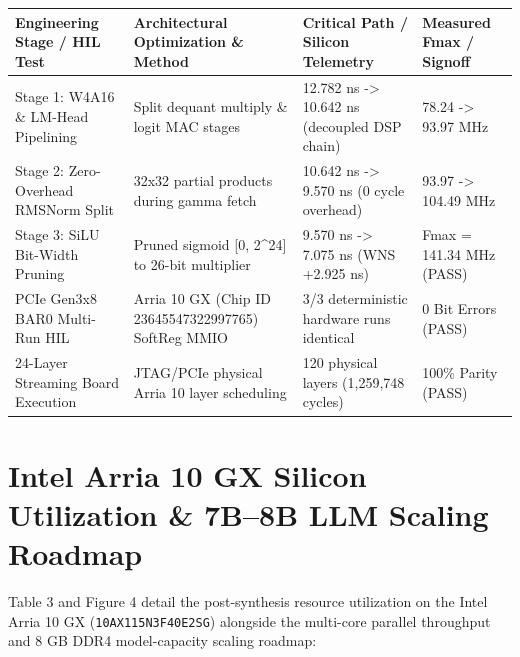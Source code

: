 \documentclass[11pt,a4paper]{article}
\begin{document}
{\footnotesize\renewcommand{\arraystretch}{1.14}\begin{longtable}{@{}L{0.23\textwidth}L{0.27\textwidth}L{0.24\textwidth}L{0.16\textwidth}@{}}\toprule

\textbf{Engineering Stage /\allowbreak{} HIL Test} & \textbf{Architectural Optimization \& Method} & \textbf{Critical Path /\allowbreak{} Silicon Telemetry} & \textbf{Measured Fmax /\allowbreak{} Signoff}\\\midrule\endhead

Stage 1: W4A16 \& LM-Head Pipelining & Split dequant multiply \& logit MAC stages & 12.782 ns -> 10.642 ns (\allowbreak{}decoupled DSP chain)\allowbreak{} & 78.24 -> 93.97 MHz\\[2pt]

Stage 2: Zero-Overhead RMSNorm Split & 32x32 partial products during gamma fetch & 10.642 ns -> 9.570 ns (\allowbreak{}0 cycle overhead)\allowbreak{} & 93.97 -> 104.49 MHz\\[2pt]

Stage 3: SiLU Bit-Width Pruning & Pruned sigmoid [\allowbreak{}0,\allowbreak{} 2\textasciicircum{}24]\allowbreak{} to 26-bit multiplier & 9.570 ns -> 7.075 ns (\allowbreak{}WNS +\allowbreak{}2.925 ns)\allowbreak{} & Fmax =\allowbreak{} 141.34 MHz (\allowbreak{}PASS)\allowbreak{}\\[2pt]

PCIe Gen3x8 BAR0 Multi-Run HIL & Arria 10 GX (\allowbreak{}Chip ID 23645547\allowbreak{}32299776\allowbreak{}5)\allowbreak{} SoftReg MMIO & 3/\allowbreak{}3 deterministic hardware runs identical & 0 Bit Errors (\allowbreak{}PASS)\allowbreak{}\\[2pt]

24-Layer Streaming Board Execution & JTAG/\allowbreak{}PCIe physical Arria 10 layer scheduling & 120 physical layers (\allowbreak{}1,\allowbreak{}259,\allowbreak{}748 cycles)\allowbreak{} & 100\% Parity (\allowbreak{}PASS)\allowbreak{}\\[2pt]

\bottomrule\end{longtable}}

\section{Intel Arria 10 GX Silicon Utilization \& 7B--8B LLM Scaling Roadmap}

Table 3 and Figure 4 detail the post-synthesis resource utilization on the Intel Arria 10 GX (\texttt{10AX115N3F40E2SG}) alongside the multi-core parallel throughput and 8 GB DDR4 model-capacity scaling roadmap:
\end{document}
